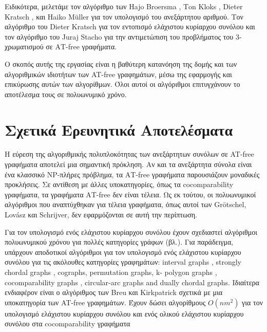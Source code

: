 Ειδικότερα, μελετάμε τον αλγόριθμο των Ηajo Βroersma , Τon Κloks , Dieter Kratsch , και Ηaiko Μüller\cite{at-free-independent-sets} για τον υπολογισμό του ανεξάρτητου αριθμού. Τον αλγόριθμο του Dieter Kratsch\cite{at-free-domination} για τον εντοπισμό ελάχιστου κυρίαρχου συνόλου και τον αλγόριθμο του Juraj Stacho\cite{at-free-3-colouring}  για την αντιμετώπιση του προβλήματος του 3-χρωματισμού σε ΑΤ-free γραφήματα. 

Ο σκοπός αυτής της εργασίας είναι η βαθύτερη κατανόηση της δομής και των αλγοριθμικών ιδιοτήτων των AT-free γραφημάτων, μέσω της εφαρμογής και επικύρωσης αυτών των αλγορίθμων. Όλοι αυτοί οι αλγόριθμοι επιτυγχάνουν το αποτέλεσμα τους σε πολυωνυμικό χρόνο. 


\section{Σχετικά Ερευνητικά Αποτελέσματα}
\label{sec:Similar_results}

Η εύρεση της αλγοριθμικής πολυπλοκότητας των ανεξάρτητων συνόλων σε AT-free γραφήματα  αποτελεί μια σημαντική πρόκληση. Αν και τα ανεξάρτητα σύνολα είναι ένα κλασσικό NP-πλήρες πρόβλημα, τα ΑΤ-free γραφήματα παρουσιάζουν μοναδικές προκλήσεις. Σε αντίθεση με άλλες υποκατηγορίες, όπως τα cocomparability γραφήματα, τα γραφήματα ΑΤ-free δεν είναι τέλεια. Ως εκ τούτου, οι πολυωνυμικοί αλγόριθμοι που αναπτύχθηκαν για τέλεια γραφήματα, όπως αυτοί των Grötschel, Lovász και Schrijver\cite{tolerance-graphs-recognition}, δεν εφαρμόζονται σε αυτή την περίπτωση.

Για τον υπολογισμό ενός ελάχιστου κυρίαρχου συνόλου έχουν σχεδιαστεί αλγόριθμοι πολυωνυμικού χρόνου για πολλές κατηγορίες γράφων (βλ.\cite{arnborg-combinatorial-algorithms,johnson-np-completeness-column}). Για παράδειγμα, υπάρχουν αποδοτικοί αλγόριθμοι για τον υπολογισμό ενός  ελάχιστου κυρίαρχου συνόλου για τις
ακόλουθες κατηγορίες γραφημάτων: interval graphs \cite{chang-domination-interval-circular-arc},
strongly chordal graphs\cite{chang-labelling-sunfree-chordal,farber-strongly-chordal-duality} , cographs\cite{corneil-perl-clustering-domination}, permutation graphs\cite{corneil-stewart-dominating-perfect-graphs,farber-keil-domination-permutation,rhee-liang-dhall-lakshmivarahan-permutation-graph-algorithm,rhee-liang-dhall-lakshmivarahan-permutation-graph-algorithm}, k-
polygon graphs \cite{elmallah-stewart-polygon-graphs}, cocomparability graphs \cite{breu-kirkpatrick-cocomparability-graphs,kratsch-stewart-cocomparability-domination}, circular-arc graphs \cite{chang-domination-interval-circular-arc-1998} and dually chordal graphs\cite{brandstadt-chepoi-dragan-hypertree-1998}. Ιδιαίτερα ενδιαφέρον είναι ο αλγόριθμος των Breu και Kirkpatrick σχετικά με μια υποκατηγορία των AT-free γραφημάτων. Έχουν δώσει αλγορίθμους $O(nm^2)$ για τον υπολογισμό   ελάχιστου κυρίαρχου συνόλου και ενός ολικού ελάχιστου κυρίαρχου συνόλου στα cocomparability γραφήματα\cite{breu-kirkpatrick-cocomparability-graphs}


